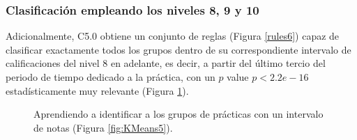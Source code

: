 \subsubsection{Clasificación empleando los niveles 8, 9 y 10}

Adicionalmente, C5.0 obtiene un conjunto de reglas (Figura \ref{rules6}) capaz de clasificar exactamente todos los grupos dentro de su correspondiente intervalo de calificaciones del nivel $8$ en adelante, es decir, a partir del último tercio del periodo de tiempo dedicado a la práctica, con un $p$ value $p < 2.2e-16$ estadísticamente muy relevante (Figura \ref{fig:cm6}).

\begin{figure}[H]
\centering
{}
\caption{Aprendiendo a identificar a los grupos de prácticas con un intervalo de notas (Figura \ref{fig:KMeans5}).}
\label{fig:cm6}
\end{figure}

